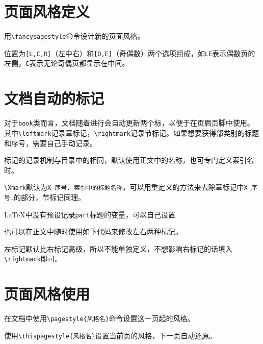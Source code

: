 \documentclass[10pt,openany]{book}
\begin{document}
\section{页面风格定义}

用\texttt{\textbackslash{}fancypagestyle}命令设计新的页面风格。



位置为\texttt{[L,C,R]}（左中右）和\texttt{[O,E]}（奇偶数）两个选项组成，如\texttt{LE}表示偶数页的左侧，\texttt{C}表示无论奇偶页都显示在中间。

\section{文档自动的标记}

对于\texttt{book}类而言，文档随着进行会自动更新两个标，以便于在页眉页脚中使用。其中\texttt{\textbackslash{}leftmark}记录章标记，\texttt{\textbackslash{}rightmark}记录节标记。如果想要获得部类别的标题和序号，需要自己手动记录。

标记的记录机制与目录中的相同，默认使用正文中的名称，也可专门定义索引名时。



\texttt{\textbackslash{}Xmark}默认为\texttt{X\ 序号.\ 索引中的标题名称}，可以用重定义的方法来去除章标记中\texttt{X\ 序号.}的部分，节标记同理。



\LaTeX 中没有预设记录\texttt{part}标题的变量，可以自己设置



也可以在正文中随时使用如下代码来修改左右两种标记。



左标记默认比右标记高级，所以不能单独定义，不想影响右标记的话填入\texttt{\textbackslash{}rightmark}即可。

\section{页面风格使用}

在文档中使用\texttt{\textbackslash{}pagestyle\{风格名\}}命令设置这一页起的风格。

使用\texttt{\textbackslash{}thispagestyle\{风格名\}}设置当前页的风格，下一页自动还原。
\end{document}
